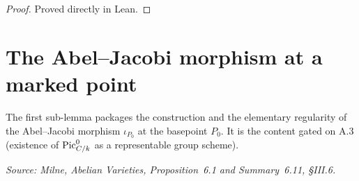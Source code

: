 \begin{proof} Proved directly in Lean. \end{proof}

\section{The Abel--Jacobi morphism at a marked point}
\label{sec:albaneseup_abel_jacobi}

The first sub-lemma packages the construction and the elementary regularity of
the Abel--Jacobi morphism \(\iota_{P_0}\) at the basepoint \(P_0\). It is the
content gated on A.3 (existence of \(\operatorname{Pic}^0_{C/k}\) as a representable group
scheme).

\begin{lemma}
  \label{lem:abel_jacobi_morphism}

  \textit{Source: Milne, \emph{Abelian Varieties}, Proposition~6.1 and
  Summary~6.11, \S III.6.}


\end{lemma}
